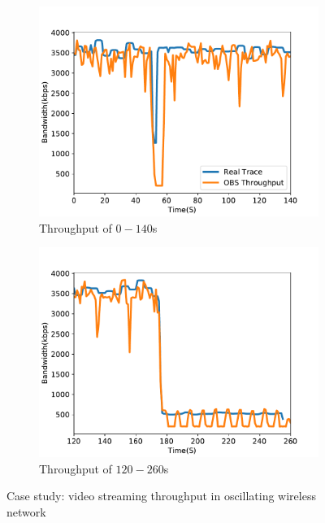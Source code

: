 
\begin{figure}[htb]
\centering
\begin{subfigure}[b]{.45\columnwidth}
\centering
\includegraphics[width=\textwidth]{fig/case_study_throughput_a.pdf}
\caption{Throughput of $0-140$s}
\label{fig:case-throughput-a} 
\end{subfigure}
\begin{subfigure}[b]{.45\columnwidth}
\centering
\includegraphics[width=\textwidth]{fig/case_study_throughput_b.pdf}
\caption{Throughput of $120-260$s}
\label{fig:case-throughput-b} 
\end{subfigure}
\caption{Case study: video streaming throughput in oscillating wireless network}
\label{fig:case-throughput} 
\end{figure} 